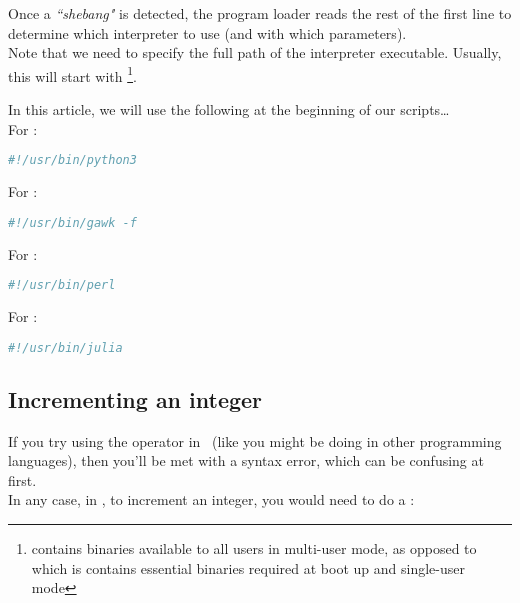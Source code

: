 Once a \emph{``shebang"} is detected, the program loader reads the rest of the first line to determine which interpreter to use (and with which parameters). \\

Note that we need to specify the full path of the interpreter executable. Usually, this will start with  \footnote{ contains binaries available to all users in multi-user mode, as opposed to  which is contains essential binaries required at boot up and single-user mode}. \\

\bigskip



In this article, we will use the following at the beginning of our scripts\dots \\

For :
\begin{lstlisting}[language=sh]
#!/usr/bin/python3
\end{lstlisting}

For \gawk:
\begin{lstlisting}[language=sh]
#!/usr/bin/gawk -f
\end{lstlisting}

For :
\begin{lstlisting}[language=sh]
#!/usr/bin/perl
\end{lstlisting}

For :
\begin{lstlisting}[language=sh]
#!/usr/bin/julia
\end{lstlisting}


\newpage
\subsection*{Incrementing an integer}



If you try using the \cmd{++} operator in \python\ (like you might be doing in other programming languages), then you'll be met with a syntax error, which can be confusing at first. \\

In any case, in \python, to increment an integer, you would need to do a :

